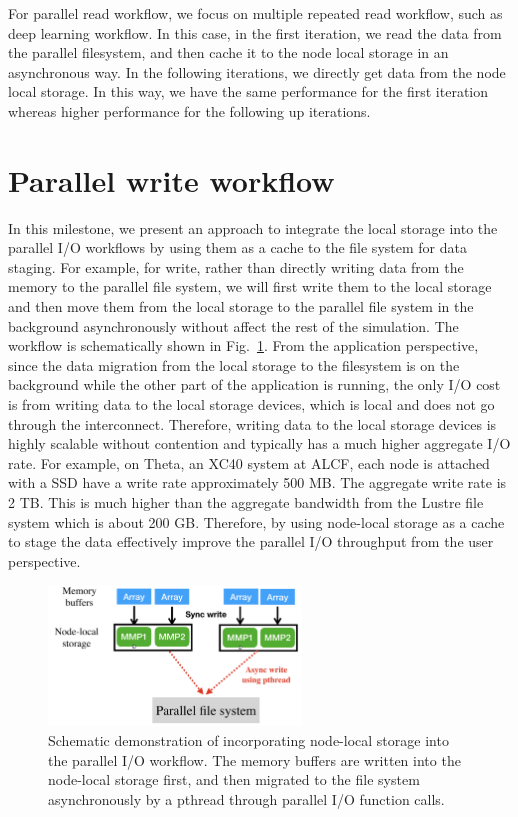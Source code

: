 \documentclass[aps, rmp, 11pt, notitlepage]{revtex4-1}
\begin{document}
For parallel read workflow, we focus on multiple repeated read workflow, such as deep learning workflow. In this case, in the first iteration, we read the data from the parallel filesystem, and then cache it to the node local storage in an asynchronous way. In the following iterations, we directly get data from the node local storage. In this way, we have the same performance for the first iteration whereas higher performance for the following up iterations.  

\section{Parallel write workflow}
In this milestone, we present an approach to integrate the local storage into the parallel I/O workflows by using them as a cache to the file system for data staging. For example, for write, rather than directly writing data from the memory to the parallel file system, we will first write them to the local storage and then move them from the local storage to the parallel file system in the background asynchronously without affect the rest of the simulation. The workflow is schematically shown in Fig.~\ref{fig:schematic}. From the application perspective, since the data migration from the local storage to the filesystem is on the background while the other part of the application is running, the only I/O cost is from writing data to the local storage devices, which is local and does not go through the interconnect. Therefore, writing data to the local storage devices is highly scalable without contention and typically has a much higher aggregate I/O rate. For example, on Theta, an XC40 system at ALCF, each node is attached with a SSD have a write rate approximately 500 MB. The aggregate write rate is 2 TB. This is much higher than the aggregate bandwidth from the Lustre file system which is about 200 GB. Therefore, by using node-local storage as a cache to stage the data effectively improve the parallel I/O throughput from the user perspective. 

\begin{figure}[hbt]
\centering
\includegraphics[width=0.6\textwidth]{schematic.png}
\caption{Schematic demonstration of incorporating node-local storage into the parallel I/O workflow. The memory buffers are written into the node-local storage first, and then migrated to the file system asynchronously by a pthread through parallel I/O function calls.}\label{fig:schematic}
\end{figure} 
\end{document}
